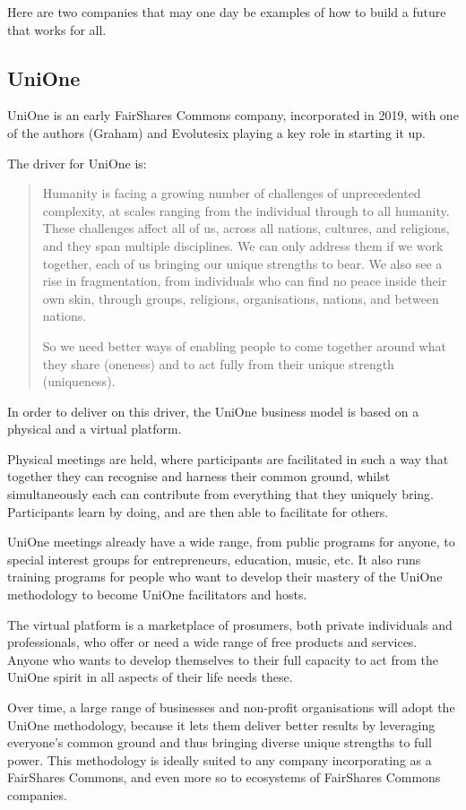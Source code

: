 Here are two companies that may one day be examples of how to build a future that works for all. 
\subsection{UniOne}
UniOne is an early FairShares Commons company, incorporated in 2019, with one of the authors (Graham) and Evolutesix playing a key role in starting it up. 


The driver for UniOne is:
\begin{quotation}
Humanity is facing a growing number of challenges of unprecedented complexity, at scales ranging from the individual through to all humanity. These challenges affect all of us, across all nations, cultures, and religions, and they span multiple disciplines. We can only address them if we work together, each of us bringing our unique strengths to bear. We also see a rise in fragmentation, from individuals who can find no peace inside their own skin, through groups, religions, organisations, nations, and between nations.


\noindent So we need better ways of enabling people to come together around what they share (oneness) and to act fully from their unique strength (uniqueness).
\end{quotation}


In order to deliver on this driver, the UniOne  business model is based on a physical and a virtual platform.


Physical meetings are held, where participants are facilitated in such a way that together they can recognise and harness their common ground, whilst simultaneously each can contribute from everything that they uniquely bring. Participants learn by doing, and are then able to facilitate for others.


UniOne meetings already have a wide range, from public programs for anyone, to special interest groups for entrepreneurs, education, music, etc. It also runs training programs for people who want to develop their mastery of the UniOne methodology to become UniOne facilitators and hosts.


The virtual platform is a marketplace of prosumers, both private individuals and professionals, who offer or need a wide range of free products and services. Anyone who wants to develop themselves to their full capacity to act from the UniOne spirit in all aspects of their life needs these.


Over time, a large range of businesses and non-profit organisations will adopt the UniOne methodology, because it lets them deliver better results by leveraging everyone's common ground and thus bringing diverse unique strengths to full power. This methodology is ideally suited to any company incorporating as a FairShares Commons, and even more so to ecosystems of FairShares Commons companies.


